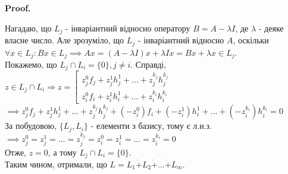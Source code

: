 \documentclass[a4paper, 10pt]{article}
\makeatletter
\def\qed{$\blacksquare$}
\theoremstyle{theoremdd}
\theoremstyle{theoremdd}
\theoremstyle{theoremdd}
\theoremstyle{theoremdd}
\theoremstyle{theoremdd}
\theoremstyle{theoremdd}
\theoremstyle{theoremdd}
\theoremstyle{theoremdd}
\renewenvironment{proof}[1][Proof.\\]{\par
\pushQED{\hfill \qed}%
\normalfont \topsep6\p@\@plus6\p@\relax
\trivlist
\item\relax
{\bfseries
#1\@addpunct{.}}\hspace\labelsep\ignorespaces
}{%
\popQED\endtrivlist\@endpefalse
}
\makeatother
\begin{document}
\begin{proof}
Нагадаю, що $L_j$ - інваріантний відносно оператору $B = A-\lambda I$, де $\lambda$ - деяке власне число. Але зрозуміло, що $L_j$ - інваріантний відносно $A$, оскільки\\
$\forall x \in L_j: Bx \in L_j \implies Ax = (A-\lambda I)x + \lambda Ix = Bx + \lambda x \in L_j$.\\
Покажемо, що $L_j \cap L_i = \{0\}, j \neq i$. Справді,\\
$z \in L_j \cap L_i \Rightarrow z = \left[\begin{gathered} z^0_j f_j + z^1_j h^1_j + \dots + z_j^{k_j} h_j^{k_j} \\ z_i^0f_i + z_i^1 h_i^1 + \dots + z_i^{k_i} h_i^{k_i} \end{gathered} \right.$\\
$\implies z^0_j f_j + z^1_j h^1_j + \dots + z_j^{k_j} h_j^{k_j} + (-z_i^0)f_i + (-z_i^1) h_i^1 + \dots + (-z_i^{k_i}) h_i^{k_i} = 0$\\
За побудовою, $\{L_j, L_i\}$ - елементи з базису, тому є л.н.з.\\
$\implies z^0_j = z^1_j = \dots = z^{k_j}_j = z^0_i = z^1_i = \dots = z^{k_i}_i = 0$\\
Отже, $z = 0$, а тому $L_j \cap L_i = \{0\}$.\\
Таким чином, отримали, що $L = L_1 \dot{+} L_2 \dot{+} \dots \dot{+} L_m$.
\end{proof}
\end{document}
